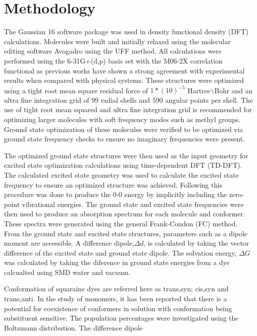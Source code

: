 \documentclass[journal=jacsat,manuscript=article]{achemso}
\begin{document}
\section{Methodology}
The Gaussian 16 software package\cite{g16}⁠ was used in density functional density (DFT) calculations. Molecules were built and initially relaxed using the molecular editing software Avogadro\cite{Hanwell2012Avogadro:Platform}⁠ using the UFF\cite{Rappe1992UFFSimulations}⁠ method. All calculations were performed using the 6-31G+(d,p) basis set with the M06-2X\cite{Zhao2008TheFunction}⁠ correlation functional as previous works have shown a strong agreement with experimental results when compared with physical systems\citep{Jacquemin2016Excited-StateCC2,Jacquemin20150-0Compounds}. These structures were optimized using a tight root mean square residual force of $1*(10)^{-5}$  Hartree$\backslash$Bohr and an ultra fine integration grid of $99$ radial shells and $590$ angular points per shell. The use of tight root mean squared and ultra fine integration grid is recommended for optimizing larger molecules with soft frequency modes such as methyl groups\cite{AzaisTestingSuper-Resolution}. Ground state optimization of these molecules were verified to be optimized via ground state frequency checks to ensure no imaginary frequencies were present.

The optimized ground state structures were then used as the input geometry for excited state optimization calculations using time-dependent DFT (TD-DFT). The calculated excited state geometry was used to calculate the excited state frequency to ensure an optimized structure was achieved. Following this procedure was done to produce the 0-0 energy by implicitly including the zero-point vibrational energies\cite{Adamo2013TheTheory}. The ground state and excited state frequencies were then used to produce an absorption spectrum for each molecule and conformer. These spectra were generated using the general Frank-Condon (FC) method. From the ground state and excited state structures, parameters such as a dipole moment are accessible. A difference dipole,$\Delta d$, is calculated by taking the vector difference of the excited state and ground state dipole. The solvation energy, $\Delta G$ was calculated by taking the diference in ground state energies from a dye calcualted using SMD\cite{Marenich2009UniversalTensions} water and vacuum.

Conformation of squaraine dyes are referred here as trans,syn; cis,syn and trans,anti. In the study of monomers, it has been reported that there is a potential for coexistence of conformers in solution with conformation being substituent sensitive\citep{Kolosova2019MolecularSquaraines,Rohr2018ExcitonDimers}⁠. The population percentages were investigated using the Boltzmann distribution.
The difference dipole 
\end{document}
